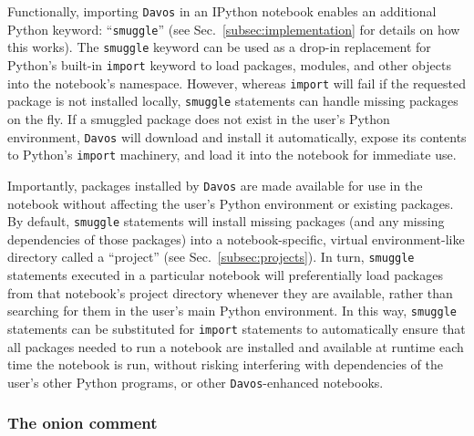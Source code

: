 \documentclass[preprint,12pt,a4paper]{elsarticle}
\begin{document}
Functionally, importing \texttt{Davos} in an IPython notebook enables
an additional Python keyword: ``\texttt{smuggle}'' (see
Sec.~\ref{subsec:implementation} for details on how this works).
The \texttt{smuggle} keyword can be used as a drop-in
replacement for Python's built-in \texttt{import} keyword to load
packages, modules, and other objects into the notebook's namespace.
However, whereas \texttt{import} will fail if the requested package is
not installed locally, \texttt{smuggle} statements can handle missing
packages on the fly.  If a smuggled package does not exist in the
user's Python environment, \texttt{Davos} will download and install it automatically,
expose its contents to Python's \texttt{import} machinery, and load it
into the notebook for immediate use.

Importantly, packages installed by \texttt{Davos} are made available for use in the
notebook without affecting the user's Python environment or existing packages.
By default, \texttt{smuggle} statements will install missing packages (and any
missing dependencies of those packages) into a notebook-specific, virtual
environment-like directory called a ``project'' (see
Sec.~\ref{subsec:projects}). In turn, \texttt{smuggle} statements executed in a
particular notebook will preferentially load packages from that notebook's
project directory whenever they are available, rather than searching for them
in the user's main Python environment. In this way, \texttt{smuggle}
statements can be substituted for \texttt{import} statements to automatically
ensure that all packages needed to run a notebook are installed and available
at runtime each time the notebook is run, without risking interfering with
dependencies of the user's other Python programs, or other \texttt{Davos}-enhanced
notebooks.


\subsubsection{The onion comment}\label{subsec:onion}
\end{document}
